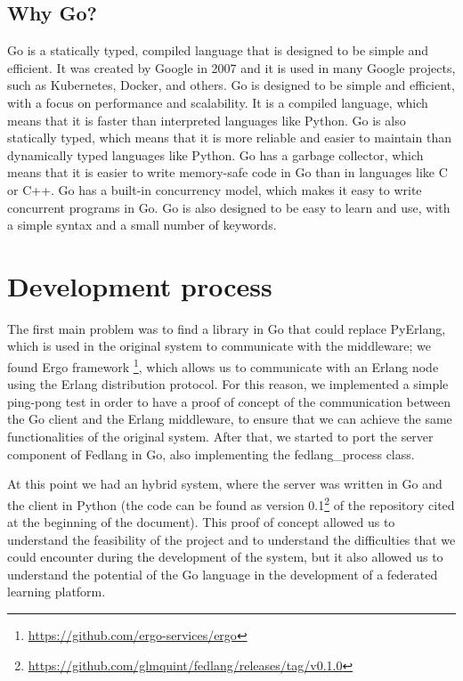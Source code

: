 \subsection{Why Go?}
Go is a statically typed, compiled language that is designed to be simple and efficient. It was created by Google in 2007 and it is used in many Google projects, such as Kubernetes, Docker, and others. Go is designed to be simple and efficient, with a focus on performance and scalability. It is a compiled language, which means that it is faster than interpreted languages like Python. Go is also statically typed, which means that it is more reliable and easier to maintain than dynamically typed languages like Python. Go has a garbage collector, which means that it is easier to write memory-safe code in Go than in languages like C or C++. Go has a built-in concurrency model, which makes it easy to write concurrent programs in Go. Go is also designed to be easy to learn and use, with a simple syntax and a small number of keywords.

\section{Development process}
The first main problem was to find a library in Go that could replace PyErlang, which is used in the original system to communicate with the middleware; we found Ergo framework \footnote{\url{https://github.com/ergo-services/ergo}}, which allows us to communicate with an Erlang node using the Erlang distribution protocol.
For this reason, we implemented a simple ping-pong test in order to have a proof of concept of the communication between the Go client and the Erlang middleware, to ensure that we can achieve the same functionalities of the original system. After that, we started to port the server component of Fedlang in Go, also implementing the fedlang\_process class. 

At this point we had an hybrid system, where the server was written in Go and the client in Python (the code can be found as version 0.1\footnote{\url{https://github.com/glmquint/fedlang/releases/tag/v0.1.0}} of the repository cited at the beginning of the document). This proof of concept allowed us to understand the feasibility of the project and to understand the difficulties that we could encounter during the development of the system, but it also allowed us to understand the potential of the Go language in the development of a federated learning platform.


